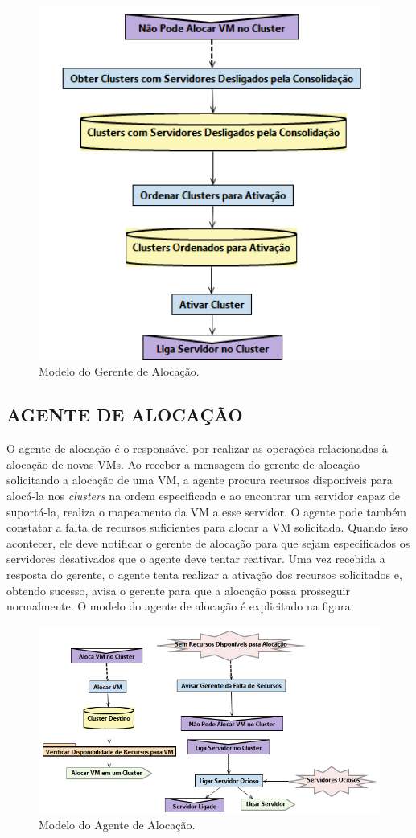 \begin{figure}[!htb]
	\centering
	\caption{Modelo do Gerente de Alocação.}\label{fig:gerente-alocacao2}
	\includegraphics[width=1\textwidth]{figuras/gerente-alocacao2.png}
\end{figure}

\subsection{AGENTE DE ALOCAÇÃO}

O agente de alocação é o responsável por realizar as operações relacionadas à alocação de novas VMs. Ao receber a mensagem do gerente de alocação solicitando a alocação de uma VM, a agente procura recursos disponíveis para alocá-la nos \emph{clusters} na ordem especificada e ao encontrar um servidor capaz de suportá-la, realiza o mapeamento da VM a esse servidor. O agente pode também constatar a falta de recursos suficientes para alocar a VM solicitada. Quando isso acontecer, ele deve notificar o gerente de alocação para que sejam especificados os servidores desativados que o agente deve tentar reativar. Uma vez recebida a resposta do gerente, o agente tenta realizar a ativação dos recursos solicitados e, obtendo sucesso, avisa o gerente para que a alocação possa prosseguir normalmente. O modelo do agente de alocação é explicitado na figura.

\begin{figure}[!htb]
	\centering
	\caption{Modelo do Agente de Alocação.}\label{fig:agente-alocacao}
	\includegraphics[width=1\textwidth]{figuras/agente-alocacao.png}
\end{figure}